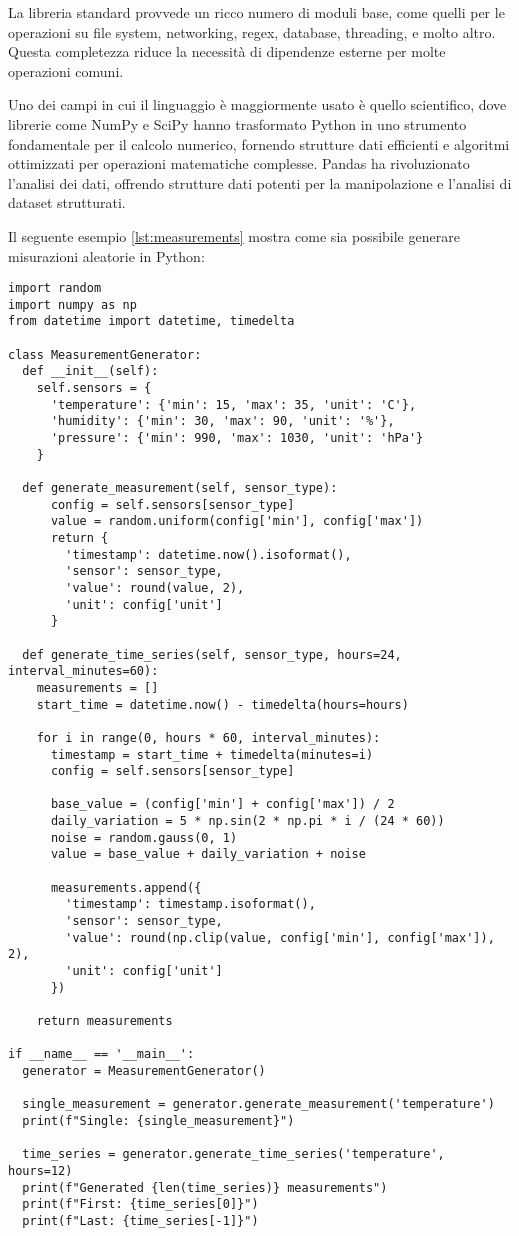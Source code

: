 La libreria standard provvede un ricco numero di moduli base, come quelli per le operazioni su file system, networking,
regex, database, threading, e molto altro. Questa completezza riduce la necessità di dipendenze esterne per molte
operazioni comuni.

Uno dei campi in cui il linguaggio è maggiormente usato è quello scientifico, dove librerie come NumPy e SciPy
hanno trasformato Python in uno strumento fondamentale per il calcolo numerico,
fornendo strutture dati efficienti e algoritmi ottimizzati per operazioni matematiche complesse.
Pandas ha rivoluzionato l'analisi dei dati, offrendo strutture dati potenti per la manipolazione e l'analisi
di dataset strutturati.

Il seguente esempio \ref{lst:measurements} mostra come sia possibile generare misurazioni aleatorie in Python:

\begin{lstlisting}[caption={Generazione di misurazioni aleatorie in Python}, label=lst:measurements]
import random
import numpy as np
from datetime import datetime, timedelta

class MeasurementGenerator:
  def __init__(self):
    self.sensors = {
      'temperature': {'min': 15, 'max': 35, 'unit': 'C'},
      'humidity': {'min': 30, 'max': 90, 'unit': '%'},
      'pressure': {'min': 990, 'max': 1030, 'unit': 'hPa'}
    }

  def generate_measurement(self, sensor_type):
      config = self.sensors[sensor_type]
      value = random.uniform(config['min'], config['max'])
      return {
        'timestamp': datetime.now().isoformat(),
        'sensor': sensor_type,
        'value': round(value, 2),
        'unit': config['unit']
      }

  def generate_time_series(self, sensor_type, hours=24, interval_minutes=60):
    measurements = []
    start_time = datetime.now() - timedelta(hours=hours)

    for i in range(0, hours * 60, interval_minutes):
      timestamp = start_time + timedelta(minutes=i)
      config = self.sensors[sensor_type]

      base_value = (config['min'] + config['max']) / 2
      daily_variation = 5 * np.sin(2 * np.pi * i / (24 * 60))
      noise = random.gauss(0, 1)
      value = base_value + daily_variation + noise

      measurements.append({
        'timestamp': timestamp.isoformat(),
        'sensor': sensor_type,
        'value': round(np.clip(value, config['min'], config['max']), 2),
        'unit': config['unit']
      })

    return measurements

if __name__ == '__main__':
  generator = MeasurementGenerator()

  single_measurement = generator.generate_measurement('temperature')
  print(f"Single: {single_measurement}")

  time_series = generator.generate_time_series('temperature', hours=12)
  print(f"Generated {len(time_series)} measurements")
  print(f"First: {time_series[0]}")
  print(f"Last: {time_series[-1]}")
\end{lstlisting}


